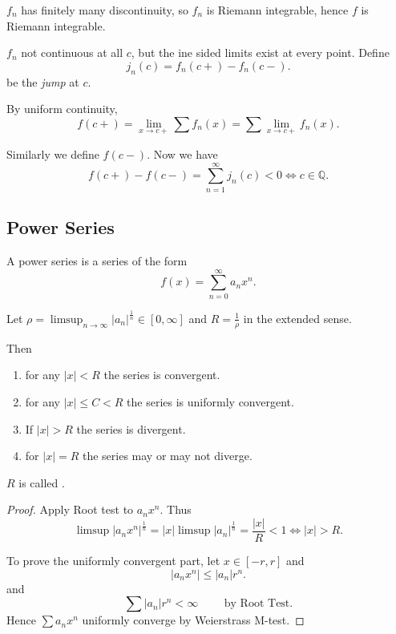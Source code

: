 	$f_n$ has finitely many discontinuity, so $f_n$ is Riemann integrable, hence $f$ is Riemann integrable.

	$f_n$ not continuous at all $c$, but the ine sided limits exist at every point. Define
	\[
		j_n(c) = f_n(c+) - f_n(c-)
	.\] 
	be the \textit{jump} at $c$. 

	By uniform continuity,
	\[
		f(c+) = \lim_{x \to c+} \sum f_n(x) = \sum \lim_{x \to c+} f_n(x)
	.\] 

	Similarly we define $f(c-)$. Now we have
	\[
		f(c+) - f(c-) = \sum_{n=1}^{\infty} j_n(c) < 0 \iff  c \in \mathbb{Q}
	.\] 

\subsection{Power Series}

A power series is a series of the form
\[
	f(x) = \sum_{n=0}^{\infty} a_n x^n
.\] 

\begin{theorem}
	Let $\rho = \limsup_{n \to \infty} |a_n|^{\frac{1}{n}} \in [0, \infty ]$ and $R = \frac{1}{\rho}$ in the extended sense. 

	Then
	\begin{enumerate}
		\item for any $|x| < R$ the series is convergent.
		\item for any $|x| \le  C < R$ the series is uniformly convergent.
		\item If $|x| >R$ the series is divergent.
		\item for $|x| = R$ the series may or may not diverge.
	\end{enumerate}
	$R$ is called .
\end{theorem}
\begin{proof}
	Apply Root test to $a_n x^n$. Thus
	\[
		\limsup |a_n x^n|^{\frac{1}{n}} = |x| \limsup |a_n|^{\frac{1}{n}} =  \frac{|x|}{R}< 1 \iff |x| > R
	.\]

	To prove the uniformly convergent part, let $x \in [-r, r] $ and
	\[
		|a_n x^n| \le |a_n| r^n
	.\] 
	and
	\[
		\sum |a_n| r^n < \infty  \qquad \text{ by Root Test}
	.\]
	Hence $\sum a_n x^n$ uniformly converge by Weierstrass M-test.
\end{proof}

